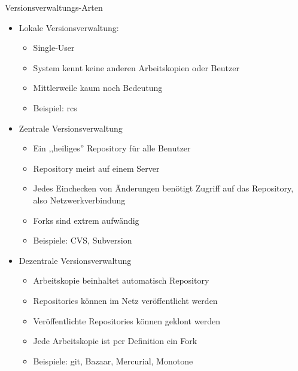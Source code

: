 \begin{frame}[allowframebreaks]{Versionsverwaltungs-Arten}
  \begin{itemize}
    \item Lokale Versionsverwaltung:
    \begin{itemize}
      \item Single-User
      \item System kennt keine anderen Arbeitskopien oder Beutzer
      \item Mittlerweile kaum noch Bedeutung
      \item Beispiel: rcs
    \end{itemize}
    \framebreak

    \item Zentrale Versionsverwaltung
    \begin{itemize}
      \item Ein ,,heiliges'' Repository für alle Benutzer
      \item Repository meist auf einem Server
      \item Jedes Einchecken von Änderungen benötigt Zugriff auf das Repository, also Netzwerkverbindung
      \item Forks sind extrem aufwändig
      \item Beispiele: CVS, Subversion
    \end{itemize}
    \framebreak

    \item Dezentrale Versionsverwaltung
    \begin{itemize}
      \item Arbeitskopie beinhaltet automatisch Repository
      \item Repositories können im Netz veröffentlicht werden
      \item Veröffentlichte Repositories können geklont werden
      \item Jede Arbeitskopie ist per Definition ein Fork
      \item Beispiele: git, Bazaar, Mercurial, Monotone
    \end{itemize}
  \end{itemize}
\end{frame}

